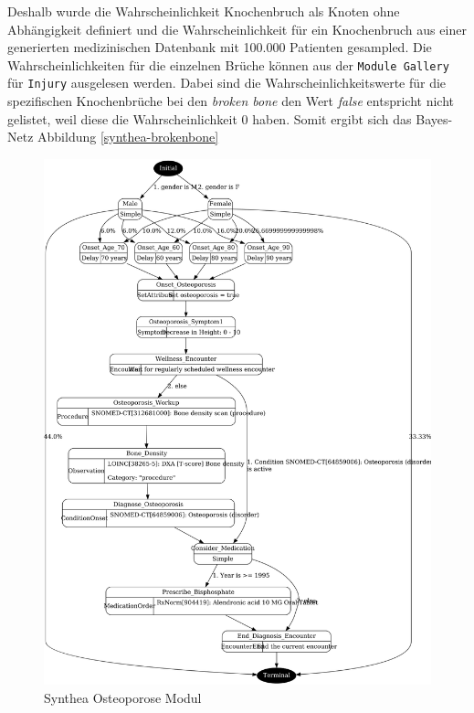 \documentclass[german,version-2020-11]{uzl-thesis}
\begin{document}
Deshalb wurde die Wahrscheinlichkeit Knochenbruch als Knoten ohne Abhängigkeit definiert und die Wahrscheinlichkeit für ein Knochenbruch aus einer generierten medizinischen Datenbank mit 100.000 Patienten gesampled. Die Wahrscheinlichkeiten für die einzelnen Brüche können aus der \texttt{Module Gallery} für \texttt{Injury} ausgelesen werden. Dabei sind die Wahrscheinlichkeitswerte für die spezifischen Knochenbrüche bei den \textit{broken bone} den Wert \textit{false} entspricht nicht gelistet, weil diese die Wahrscheinlichkeit 0 haben. Somit ergibt sich das Bayes-Netz Abbildung \ref{synthea-brokenbone}
\begin{figure}[htbp]
	\centering
	\includegraphics[width=1.0\textwidth]{assets/osteoporosis.png}
	\caption{Synthea Osteoporose Modul \cite{26}}
	\label{fig:osteoporose}
\end{figure} 
\end{document}
